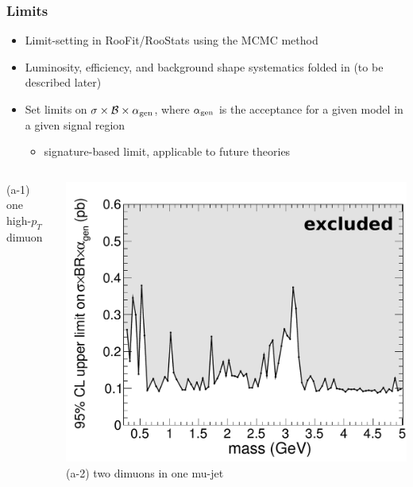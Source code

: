 \documentclass[compress]{beamer}
\newcommand{\s}[1]{{\mbox{\scriptsize #1}}}
\begin{document}
\begin{frame}
\frametitle{Limits}
\label{page:limits}

\begin{itemize}
\item Limit-setting in RooFit/RooStats using the MCMC method
\item Luminosity, efficiency, and background shape systematics folded
  in (to be described later)
\item Set limits on $\sigma \times \mathcal{B} \times \alpha_\s{gen}$,
  where $\alpha_\s{gen}$ is the acceptance for a given model in a
  given signal region
\begin{itemize}
\item signature-based limit, applicable to future theories
\end{itemize}
\end{itemize}

\vfill
\begin{columns}
\centering (a-1) one high-$p_T$ dimuon

\includegraphics[width=\linewidth]{ul__sig_a1_n4.pdf}
\centering (a-2) two dimuons in one mu-jet


\end{columns}
\end{frame}
\end{document}
